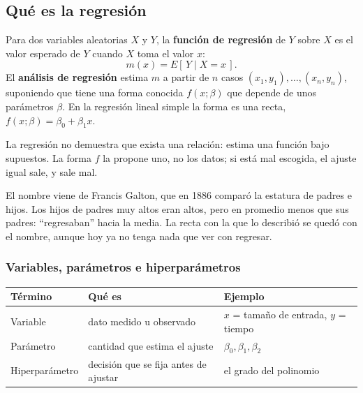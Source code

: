 \documentclass[11pt,letterpaper]{article}
\begin{document}
\subsection*{Qué es la regresión}

\begin{definicion}
    Para dos variables aleatorias $X$ y $Y$, la \textbf{función de
    regresión} de $Y$ sobre $X$ es el valor esperado de $Y$ cuando $X$
    toma el valor $x$:
    \[
        m(x) = E[\,Y \mid X = x\,] .
    \]
    El \textbf{análisis de regresión} estima $m$ a partir de $n$ casos
    $(x_1, y_1), \ldots, (x_n, y_n)$, suponiendo que tiene una forma
    conocida $f(x; \beta)$ que depende de unos parámetros $\beta$. En la
    regresión lineal simple la forma es una recta,
    $f(x; \beta) = \beta_0 + \beta_1 x$.
\end{definicion}

\begin{idea}
    La regresión no demuestra que exista una relación: estima una
    función bajo supuestos. La forma $f$ la propone uno, no los datos;
    si está mal escogida, el ajuste igual sale, y sale mal.
\end{idea}

El nombre viene de Francis Galton, que en 1886 comparó la estatura de
padres e hijos. Los hijos de padres muy altos eran altos, pero en
promedio menos que sus padres: ``regresaban'' hacia la media. La recta
con la que lo describió se quedó con el nombre, aunque hoy ya no tenga
nada que ver con regresar.

\subsubsection*{Variables, parámetros e hiperparámetros}

\begin{center}
\small
\begin{tabular}{l>{\raggedright\arraybackslash}p{4.6cm}%
                 >{\raggedright\arraybackslash}p{5.4cm}}
    \toprule
    \textbf{Término} & \textbf{Qué es} & \textbf{Ejemplo} \\
    \midrule
    Variable & dato medido u observado
             & $x$ = tamaño de entrada, $y$ = tiempo \\
    \addlinespace
    Parámetro & cantidad que estima el ajuste
              & $\beta_0, \beta_1, \beta_2$ \\
    \addlinespace
    Hiperparámetro & decisión que se fija antes de ajustar
                   & el grado del polinomio \\
    \bottomrule
\end{tabular}
\end{center}
\end{document}
